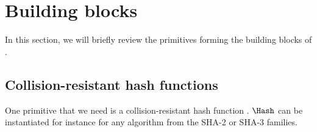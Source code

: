 \section{Building blocks}%
\label{Primitives}\label{BuildingBlocks}

In this section, we will briefly review the primitives forming the building blocks of \PRIVO.

\subsection{Collision-resistant hash functions}

One primitive that we need is a collision-resistant hash function \Hash.
\(\Hash\) can be instantiated for instance for any algorithm from the SHA-2 or SHA-3 families.











